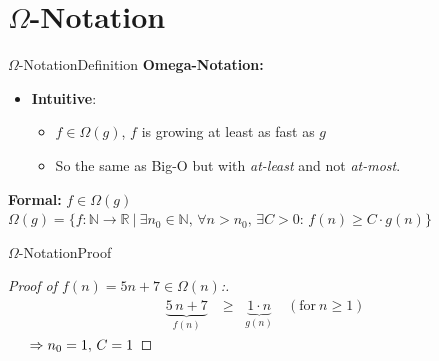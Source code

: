 
\section{\texorpdfstring{$\Omega$}{Omega}-Notation}

\begin{frame}{$\Omega$-Notation}{Definition}
  \textbf{Omega-Notation:}
  \begin{itemize}
    \item
      \textbf{Intuitive}:\\

          \begin{itemize}
            \item
              $f \in \Omega(g)$, $f$ is growing at least as fast as $g$
            \item
              So the same as Big-O but with \textit{at-least} and not \textit{at-most}.
          \end{itemize}

  \end{itemize}
 	\begin{block}{\textbf{Formal:} $f \in \Omega(g)$}
    \begin{math}
      \Omega(g) = \lbrace f: \mathbb{N} \to \mathbb{R} ~ | ~
        \exists n_0 \in \mathbb{N}, \, \forall n > n_0, \, \exists C > 0: \,
        f(n) \geq C \cdot g(n)\rbrace
    \end{math}
 	\end{block}
\end{frame}


\begin{frame}{$\Omega$-Notation}{Proof}
  \begin{proof}[Proof of $f(n) = 5n + 7 \in \Omega(n)$:]
    \begin{eqnarray*}
      &\underbrace{5 \, n + 7}_{f(n)} &\geq \;\; \underbrace{1 \cdot n}_{g(n)}
      \hspace{1em} (\text{for} ~ n \geq 1)
    \end{eqnarray*}
    $\hspace{1.5em} \Rightarrow n_0 = 1, \, C = 1$ \qedhere
  \end{proof}
\end{frame}


